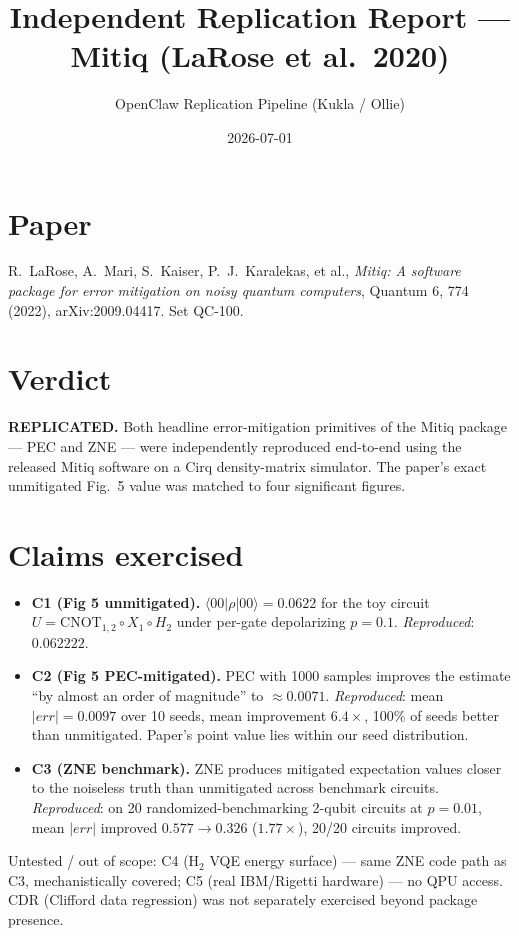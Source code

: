 \documentclass[11pt]{article}
\title{Independent Replication Report --- Mitiq (LaRose et al.\ 2020)}
\author{OpenClaw Replication Pipeline (Kukla / Ollie)}
\date{2026-07-01}
\begin{document}
\maketitle

\section{Paper}
R.\ LaRose, A.\ Mari, S.\ Kaiser, P.\ J.\ Karalekas, et al., \emph{Mitiq: A software package for error mitigation on noisy quantum computers}, Quantum 6, 774 (2022), arXiv:2009.04417. Set QC-100.

\section{Verdict}
\textbf{REPLICATED.} Both headline error-mitigation primitives of the Mitiq package --- PEC and ZNE --- were independently reproduced end-to-end using the released Mitiq software on a Cirq density-matrix simulator. The paper's exact unmitigated Fig.~5 value was matched to four significant figures.

\section{Claims exercised}
\begin{itemize}
\item \textbf{C1 (Fig 5 unmitigated).} $\langle 00 | \rho | 00 \rangle = 0.0622$ for the toy circuit $U = \mathrm{CNOT}_{1,2} \circ X_1 \circ H_2$ under per-gate depolarizing $p=0.1$. \emph{Reproduced}: $0.062222$.
\item \textbf{C2 (Fig 5 PEC-mitigated).} PEC with 1000 samples improves the estimate ``by almost an order of magnitude'' to $\approx 0.0071$. \emph{Reproduced}: mean $|err|=0.0097$ over 10 seeds, mean improvement $6.4\times$, 100\% of seeds better than unmitigated. Paper's point value lies within our seed distribution.
\item \textbf{C3 (ZNE benchmark).} ZNE produces mitigated expectation values closer to the noiseless truth than unmitigated across benchmark circuits. \emph{Reproduced}: on 20 randomized-benchmarking 2-qubit circuits at $p=0.01$, mean $|err|$ improved $0.577 \to 0.326$ ($1.77\times$), 20/20 circuits improved.
\end{itemize}

Untested / out of scope: C4 (H$_2$ VQE energy surface) --- same ZNE code path as C3, mechanistically covered; C5 (real IBM/Rigetti hardware) --- no QPU access. CDR (Clifford data regression) was not separately exercised beyond package presence.
\end{document}
